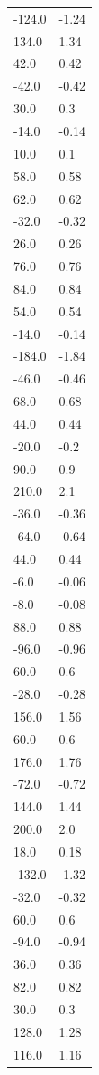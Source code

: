 \begin{longtable}{ll}
-124.0 & -1.24 \\
134.0 & 1.34 \\
42.0 & 0.42 \\
-42.0 & -0.42 \\
30.0 & 0.3 \\
-14.0 & -0.14 \\
10.0 & 0.1 \\
58.0 & 0.58 \\
62.0 & 0.62 \\
-32.0 & -0.32 \\
26.0 & 0.26 \\
76.0 & 0.76 \\
84.0 & 0.84 \\
54.0 & 0.54 \\
-14.0 & -0.14 \\
-184.0 & -1.84 \\
-46.0 & -0.46 \\
68.0 & 0.68 \\
44.0 & 0.44 \\
-20.0 & -0.2 \\
90.0 & 0.9 \\
210.0 & 2.1 \\
-36.0 & -0.36 \\
-64.0 & -0.64 \\
44.0 & 0.44 \\
-6.0 & -0.06 \\
-8.0 & -0.08 \\
88.0 & 0.88 \\
-96.0 & -0.96 \\
60.0 & 0.6 \\
-28.0 & -0.28 \\
156.0 & 1.56 \\
60.0 & 0.6 \\
176.0 & 1.76 \\
-72.0 & -0.72 \\
144.0 & 1.44 \\
200.0 & 2.0 \\
18.0 & 0.18 \\
-132.0 & -1.32 \\
-32.0 & -0.32 \\
60.0 & 0.6 \\
-94.0 & -0.94 \\
36.0 & 0.36 \\
82.0 & 0.82 \\
30.0 & 0.3 \\
128.0 & 1.28 \\
116.0 & 1.16 \\

\end{longtable}

